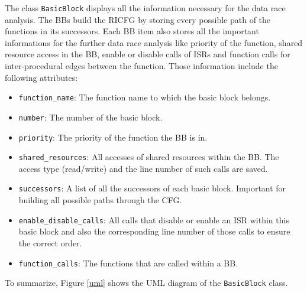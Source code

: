 \documentclass[
fancyheadings, %
%
%
]{stsreprt}
\begin{document}
{The class \texttt{BasicBlock} displays all the information necessary for the data race analysis. The \aclp{BB} build the \ac{RICFG} by storing every possible path of the functions in its successors. Each \ac{BB} item also stores all the important informations for the further data race analysis like priority of the function, shared resource access in the \ac{BB}, enable or disable calls of \acp{ISR} and function calls for inter-procedural edges between the function. Those information include the following attributes:
\begin{itemize}
	\item \texttt{function\_name}: The function name to which the basic block belongs.
	\item \texttt{number}: The number of the basic block.
	\item \texttt{priority}: The priority of the function the \ac{BB} is in.
	\item \texttt{shared\_resources}: All accesses of shared resources within the \ac{BB}. The access type (read/write) and the line number of such calls are saved.
	\item \texttt{successors}: A list of all the successors of each basic block. Important for building all possible paths through the CFG.
	\item \texttt{enable\_disable\_calls}: All calls that disable or enable an \ac{ISR} within this basic block and also the corresponding line number of those calls to ensure the correct order.
	\item \texttt{function\_calls}: The functions that are called within a \ac{BB}.
\end{itemize}
To summarize, Figure \ref{uml} shows the UML diagram of the \texttt{BasicBlock} class.
\begin{figure}[H]
	\centering
\end{figure}}
\end{document}

